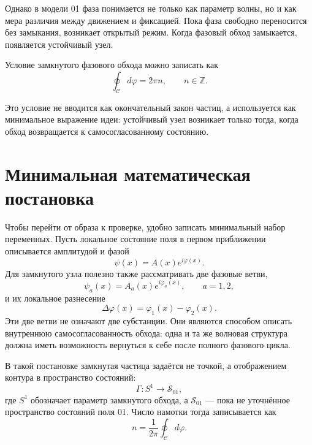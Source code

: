 \documentclass[11pt,a4paper]{article}
\newcommand{\phase}{\varphi}
\newcommand{\contour}{\mathcal{C}}
\begin{document}
Однако в модели 01 фаза понимается не только как параметр волны, но и как мера различия между движением и фиксацией. Пока фаза свободно переносится без замыкания, возникает открытый режим. Когда фазовый обход замыкается, появляется устойчивый узел.

Условие замкнутого фазового обхода можно записать как
\begin{equation}
\oint_{\contour} d\phase = 2\pi n, \qquad n \in \mathbb{Z}.
\label{eq:phase_quantization}
\end{equation}

Это условие не вводится как окончательный закон частиц, а используется как минимальное выражение идеи: устойчивый узел возникает только тогда, когда обход возвращается к самосогласованному состоянию.

\section{Минимальная математическая постановка}

Чтобы перейти от образа к проверке, удобно записать минимальный набор переменных. Пусть локальное состояние поля в первом приближении описывается амплитудой и фазой
\begin{equation}
\psi(x)=A(x)e^{i\phase(x)}.
\end{equation}
Для замкнутого узла полезно также рассматривать две фазовые ветви,
\begin{equation}
\psi_a(x)=A_a(x)e^{i\phase_a(x)}, \qquad a=1,2,
\end{equation}
и их локальное разнесение
\begin{equation}
\Delta\phase(x)=\phase_1(x)-\phase_2(x).
\end{equation}
Эти две ветви не означают две субстанции. Они являются способом описать внутреннюю самосогласованность обхода: одна и та же волновая структура должна иметь возможность вернуться к себе после полного фазового цикла.

В такой постановке замкнутая частица задаётся не точкой, а отображением контура в пространство состояний:
\begin{equation}
\Gamma: S^1 \longrightarrow \mathcal{S}_{01},
\end{equation}
где $S^1$ обозначает параметр замкнутого обхода, а $\mathcal{S}_{01}$ --- пока не уточнённое пространство состояний поля 01. Число намотки тогда записывается как
\begin{equation}
n=\frac{1}{2\pi}\oint_{\contour}d\phase.
\end{equation}
\end{document}
